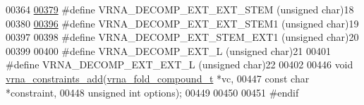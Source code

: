 \begin{DoxyCode}
00364 
\hyperlink{group__constraints_ga06efd054c9271438f6d82d4559d9e69f}{00379} \textcolor{preprocessor}{#define VRNA\_DECOMP\_EXT\_EXT\_STEM (unsigned char)18}
00380 
\hyperlink{group__constraints_ga2e75d7a77118735b32f25422d9686719}{00396} \textcolor{preprocessor}{#define VRNA\_DECOMP\_EXT\_EXT\_STEM1 (unsigned char)19}
00397 
00398 \textcolor{preprocessor}{#define VRNA\_DECOMP\_EXT\_STEM\_EXT1 (unsigned char)20}
00399 
00400 \textcolor{preprocessor}{#define VRNA\_DECOMP\_EXT\_L         (unsigned char)21}
00401 \textcolor{preprocessor}{#define VRNA\_DECOMP\_EXT\_EXT\_L     (unsigned char)22}
00402 
00446 \textcolor{keywordtype}{void} \hyperlink{group__constraints_ga35a401f680969a556858a8dd5f1d07cc}{vrna\_constraints\_add}(\hyperlink{group__fold__compound_structvrna__fc__s}{vrna\_fold\_compound\_t}  *vc,
00447                           \textcolor{keyword}{const} \textcolor{keywordtype}{char}            *constraint,
00448                           \textcolor{keywordtype}{unsigned} \textcolor{keywordtype}{int}          options);
00449 
00450 
00451 \textcolor{preprocessor}{#endif}
\end{DoxyCode}
